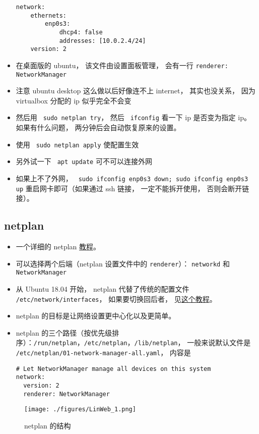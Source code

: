 \begin{itemize}
\begin{lstlisting}[language=none]
network:
    ethernets:
        enp0s3:
            dhcp4: false
            addresses: [10.0.2.4/24]
    version: 2
\end{lstlisting}
\item 在桌面版的 ubuntu， 该文件由设置面板管理， 会有一行 \verb|renderer: NetworkManager|
\item 注意 ubuntu desktop 这么做以后好像连不上 internet， 其实也没关系， 因为 virtualbox 分配的 ip 似乎完全不会变
\item 然后用 \verb` sudo netplan try`， 然后 \verb` ifconfig` 看一下 ip 是否变为指定 ip。 如果有什么问题， 两分钟后会自动恢复原来的设置。
\item 使用 \verb` sudo netplan apply` 使配置生效
\item 另外试一下 \verb` apt update` 可不可以连接外网
\item 如果上不了外网， \verb` sudo ifconfig enp0s3 down; sudo ifconfig enp0s3 up` 重启网卡即可（如果通过 ssh 链接， 一定不能拆开使用， 否则会断开链接）。
\end{itemize}

\subsection{netplan}
\begin{itemize}
\item 一个详细的 netplan \href{https://linuxconfig.org/netplan-network-configuration-tutorial-for-beginners}{教程}。
\item 可以选择两个后端（netplan 设置文件中的 \verb|renderer|）： \verb|networkd| 和 \verb|NetworkManager|
\item 从 Ubuntu 18.04 开始， netplan 代替了传统的配置文件 \verb|/etc/network/interfaces|， 如果要切换回后者， 见\href{https://linuxconfig.org/how-to-switch-back-networking-to-etc-network-interfaces-on-ubuntu-20-04-focal-fossa-linux}{这个教程}。
\item netplan 的目标是让网络设置更中心化以及更简单。
\item netplan 的三个路径（按优先级排序）：\verb|/run/netplan|，\verb|/etc/netplan|，\verb|/lib/netplan|， 一般来说默认文件是 \verb|/etc/netplan/01-network-manager-all.yaml|， 内容是
\begin{lstlisting}[language=none]
# Let NetworkManager manage all devices on this system
network:
  version: 2
  renderer: NetworkManager
\end{lstlisting}
\end{itemize}
\begin{figure}[ht]
\centering
\texttt{[image: ./figures/LinWeb\_1.png]}
\caption{netplan 的结构} \label{LinWeb_fig1}
\end{figure}




